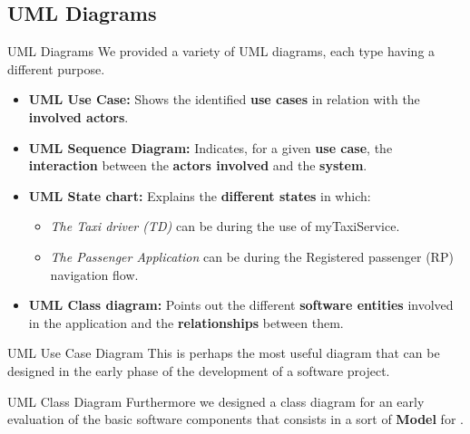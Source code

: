 \documentclass{../common/latex_classes/pdf_presentation}
\begin{document}
	\subsection{UML Diagrams}
	\begin{frame}{UML Diagrams}
		We provided a variety of UML diagrams, each type having a different purpose.
		\begin{itemize}
			\item\textbf{UML Use Case:} Shows the identified \textbf{use cases} in relation with the \textbf{involved actors}.
			\item\textbf{UML Sequence Diagram:} Indicates, for a given \textbf{use case}, the \textbf{interaction} between the \textbf{actors involved} and the \textbf{system}.
			\item\textbf{UML State chart:} Explains the \textbf{different states} in which:
			\begin{itemize}
				\item\textit{The Taxi driver (TD)} can be during the use of myTaxiService.
				\item\textit{The Passenger Application} can be during the Registered passenger (RP) navigation flow.
			\end{itemize}
			\item\textbf{UML Class diagram:} Points out the different \textbf{software entities} involved in the application and the \textbf{relationships} between them.
		\end{itemize}
	\end{frame}
	\begin{frame}{UML Use Case Diagram}
		This is perhaps the most useful diagram that can be designed in the early phase of the development of a software project.
	\end{frame}
	\begin{frame}{UML Class Diagram}
		Furthermore we designed a class diagram for an early evaluation of the basic software components that consists in a sort of \textbf{Model} for \myTaxiService{}.
	\end{frame}
\end{document}
